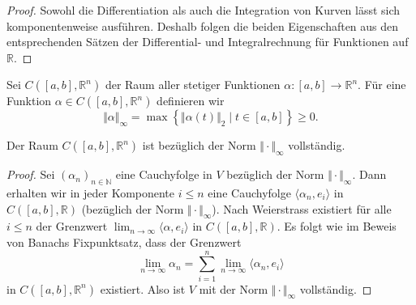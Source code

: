 \documentclass[../main.tex]{subfiles}
\begin{document}
\begin{proof}
  Sowohl die Differentiation als auch die Integration von Kurven
  lässt sich komponentenweise ausführen.
  Deshalb folgen die beiden Eigenschaften aus den entsprechenden
  Sätzen der Differential- und Integralrechnung für Funktionen
  auf $\mathbb{R}$.
\end{proof}

Sei $C([a, b], \mathbb{R}^n)$ der Raum aller stetiger
Funktionen $\alpha \colon [a, b] \to \mathbb{R}^n$.
Für eine Funktion $\alpha \in C([a, b], \mathbb{R}^n)$ definieren wir
\[
  \Vert \alpha \Vert_{\infty}
  = \max \left\{\Vert \alpha(t) \Vert_2 \mid 
  t \in [a, b]\right\} \geq 0.
\]

\begin{lemma}
  Der Raum $C([a, b], \mathbb{R}^n)$ ist bezüglich der Norm
  $\Vert \cdot \Vert_{\infty}$ vollständig.
\end{lemma}

\begin{proof}
  Sei ${(\alpha_{n})}_{n \in \mathbb{N}}$ 
  eine Cauchyfolge in $V$ bezüglich der Norm
  $\Vert \cdot \Vert_{\infty}$.
  Dann erhalten wir in jeder Komponente $i \leq n$ 
  eine Cauchyfolge $\langle \alpha_n, e_i \rangle$ 
  in $C([a, b], \mathbb{R})$ (bezüglich der Norm
  $\Vert \cdot \Vert_{\infty}$).
  Nach Weierstrass existiert für alle $i \leq n$ 
  der Grenzwert
  $\lim_{n \to \infty} \langle \alpha, e_i \rangle$ 
  in $C([a, b], \mathbb{R})$.
  Es folgt
  wie im Beweis von Banachs Fixpunktsatz, dass der Grenzwert
  \[
    \lim_{n \to \infty} \alpha_n
    = \sum_{i=1}^{n} \lim_{n \to \infty}
    \langle \alpha_n, e_i \rangle
  \]
  in $C([a, b], \mathbb{R}^n)$ existiert.
  Also ist $V$ mit der Norm $\Vert \cdot \Vert_\infty$ vollständig.
\end{proof}
\end{document}
